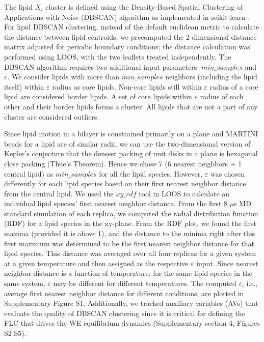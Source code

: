 \documentclass{biophys-new}
\begin{document}
The lipid $X_i$ cluster is defined using the Density-Based Spatial Clustering of Applications with Noise (DBSCAN) algorithm \cite{MartinEsterHans-PeterKriegelJiirgSander1996, Ester2017} as implemented in scikit-learn \cite{PedregosaF.VaroquauxG.GramfortA.MichelV.ThirionB.GriselO.BlondelM.PrettenhoferP.WeissR.andDubourgV.VanderplasJ.PassosA.CournapeauD.BrucherM.PerrotM.Duchesnay2011}.
For lipid DBSCAN clustering, instead of the default euclidean metric to calculate the distance between lipid centroids, we precomputed the 2-dimensional distance matrix adjusted for periodic boundary conditions; the distance calculation was performed using LOOS, with the two leaflets treated independently.
The DBSCAN algorithm requires two additional input parameters: $min\_samples$ and $\varepsilon$.
We consider lipids with more than $min\_samples$ neighbors (including the lipid itself) within $\varepsilon$ radius as core lipids.
Non-core lipids still within $\varepsilon$ radius of a core lipid are considered border lipids.
A set of core lipids within $\varepsilon$ radius of each other and their border lipids forms a cluster.
All lipids that are not a part of any cluster are considered outliers.

Since lipid motion in a bilayer is constrained primarily on a plane and MARTINI beads for a lipid are of similar radii, we can use the two-dimensional version of Kepler's conjecture that the densest packing of unit disks in a plane is hexagonal close packing (Thue's Theorem).
Hence we chose 7 (6 nearest neighbors + 1 central lipid) as $min\_samples$ for all the lipid species.
However, $\varepsilon$ was chosen differently for each lipid species based on their first nearest neighbor distance from the central lipid.
We used the $xy\_rdf$ tool in LOOS to calculate an individual lipid species' first nearest neighbor distance.
From the first 8 $\mu$s MD standard simulation of each replica, we computed the radial distribution function (RDF) for a lipid species in the xy-plane. 
From the RDF plot, we found the first maxima (provided it is above 1), and the distance to the minima right after this first maximum was determined to be the first nearest neighbor distance for that lipid species.
This distance was averaged over all four replicas for a given system at a given temperature and then assigned as the respective $\varepsilon$ input.
Since nearest neighbor distance is a function of temperature, for the same lipid species in the same system, $\varepsilon$ may be different for different temperatures.
The computed $\varepsilon$, i.e., average first nearest neighbor distance for different conditions, are plotted in Supplementary Figure S1.
Additionally, we tracked auxiliary variables (AVs) that evaluate the quality of DBSCAN clustering since it is critical for defining the FLC that drives the WE equilibrium dynamics (Supplementary section 4, Figures S2-S5).
\end{document}
